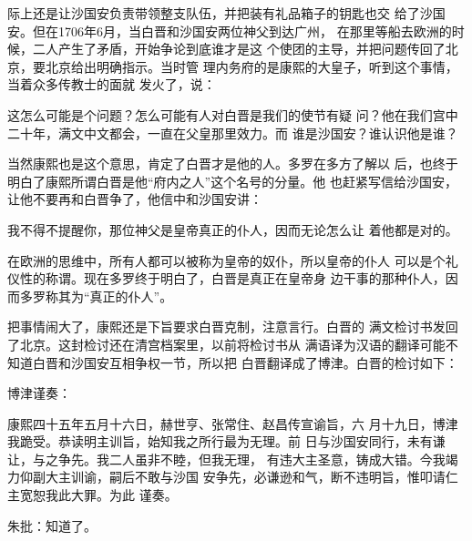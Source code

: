 际上还是让沙国安负责带领整支队伍，并把装有礼品箱子的钥匙也交%
给了沙国安。但在1706年6月，当白晋和沙国安两位神父到达广州，%
在那里等船去欧洲的时候，二人产生了矛盾，开始争论到底谁才是这%
个使团的主导，并把问题传回了北京，要北京给出明确指示。当时管%
理内务府的是康熙的大皇子，听到这个事情，当着众多传教士的面就%
发火了，说：%
\par
{\bookkai 这怎么可能是个问题？怎么可能有人对白晋是我们的使节有疑}%
{\bookkai 问？他在我们宫中二十年，满文中文都会，一直在父皇那里效力。而}%
{\bookkai 谁是沙国安？谁认识他是谁？}%
\par
当然康熙也是这个意思，肯定了白晋才是他的人。多罗在多方了解以%
后，也终于明白了康熙所谓白晋是他“府内之人”这个名号的分量。他%
也赶紧写信给沙国安，让他不要再和白晋争了，他信中和沙国安讲：%
\par
{\bookkai 我不得不提醒你，那位神父是皇帝真正的仆人，因而无论怎么让}%
{\bookkai 着他都是对的。}%
\par
在欧洲的思维中，所有人都可以被称为皇帝的奴仆，所以皇帝的仆人%
可以是个礼仪性的称谓。现在多罗终于明白了，白晋是真正在皇帝身%
边干事的那种仆人，因而多罗称其为“真正的仆人”。%
\par
把事情闹大了，康熙还是下旨要求白晋克制，注意言行。白晋的%
满文检讨书发回了北京。这封检讨还在清宫档案里，以前将检讨书从%
满语译为汉语的翻译可能不知道白晋和沙国安互相争权一节，所以把%
白晋翻译成了博津。白晋的检讨如下：%
\par
{\bookkai 博津谨奏：}%
\par
{\bookkai 康熙四十五年五月十六日，赫世亨、张常住、赵昌传宣谕旨，六}%
{\bookkai 月十九日，博津我跪受。恭读明主训旨，始知我之所行最为无理。前}%
{\bookkai 日与沙国安同行，未有谦让，与之争先。我二人虽非不睦，但我无理，}%
{\bookkai 有违大主圣意，铸成大错。今我竭力仰副大主训谕，嗣后不敢与沙国}%
{\bookkai 安争先，必谦逊和气，断不违明旨，惟叩请仁主宽恕我此大罪。为此}%
{\bookkai 谨奏。}%
\par
{\bookkai 朱批：知道了。}%
